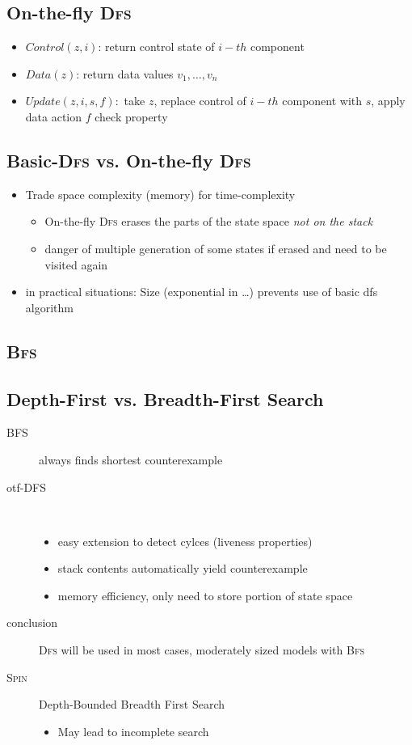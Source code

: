 \documentclass[a4paper, 10pt]{article}
\begin{document}
\subsection*{On-the-fly \textsc{Dfs}}

\begin{itemize}
    \item $Control(z,i)$: return control state of $i-th$ component
    \item $Data(z)$: return data values $v_1,\dots,v_n$
    \item $Update(z,i,s,f):$ take $z$, replace control of $i-th$ component with $s$, apply data action $f$ \follows check property
\end{itemize}
\subsection*{Basic-\textsc{Dfs} vs. On-the-fly \textsc{Dfs}}
\begin{itemize}
    \item Trade space complexity (memory) for time-complexity
    \begin{itemize}
        \item On-the-fly \textsc{Dfs} erases the parts of the state space \emph{not on the stack}
        \item danger of multiple generation of some states if erased and need to be visited again
    \end{itemize}
    \item in practical situations: Size (exponential in \dots) prevents use of basic dfs algorithm
\end{itemize}
\subsection*{\textsc{Bfs}}

\subsection*{Depth-First vs. Breadth-First Search}
\begin{description}
    \item[BFS] always finds shortest counterexample
    \item[otf-DFS] \ \\
    \begin{itemize}
        \item easy extension to detect cylces (liveness properties)
        \item stack contents automatically yield counterexample
        \item memory efficiency, only need to store portion of state space
    \end{itemize}
    \item[conclusion]\textsc{Dfs} will be used in most cases, moderately sized models with \textsc{Bfs}
    \item[\textsc{Spin}] Depth-Bounded Breadth First Search
    \begin{itemize}
        \item May lead to incomplete search
    \end{itemize}
\end{description}
\end{document}
